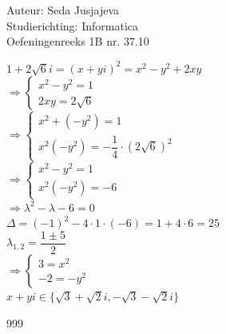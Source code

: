 \documentclass[a4paper]{article}
\begin{document}
\noindent \large Auteur: Seda Jusjajeva\\
\noindent \large Studierichting: Informatica\\
\noindent \large Oefeningenreeks 1B nr. 37.10\\

\medskip

\normalsize

$1 + 2\sqrt{6}i = (x + yi)^2 = x^2 - y^2 + 2xy$ \\

$\Rightarrow\left \{\begin{array}{l}
	x^2 - y^2 = 1 \\
	2xy = 2\sqrt{6}
\end{array} \right .$ \\

$\Rightarrow\left \{\begin{array}{l}
	x^2 + (-y^2) = 1 \\
	x^2 (-y^2) = -\dfrac{1}{4}\cdot(2\sqrt{6})^2
\end{array} \right .$ \\

$\Rightarrow\left \{\begin{array}{l}
	x^2 - y^2 = 1 \\
	x^2 (-y^2) = -6
\end{array} \right .$ \\

$\Rightarrow \lambda^2 - \lambda - 6 = 0 $\\

$\Delta = (-1)^2 - 4\cdot 1 \cdot (-6) = 1 + 4 \cdot 6 = 25$ \\

$\lambda_{1,2} = \dfrac{1\pm5}{2}$ \\

$\Rightarrow\left\{\begin{array}{l}
	3 = x^2 \\
	-2 = -y^2
\end{array} \right .$ \\

$x + yi \in \{\sqrt{3} + \sqrt{2}i, -\sqrt{3} - \sqrt{2}i\}$ \\


\begin{thebibliography}{999}
\end{thebibliography}
\end{document}
